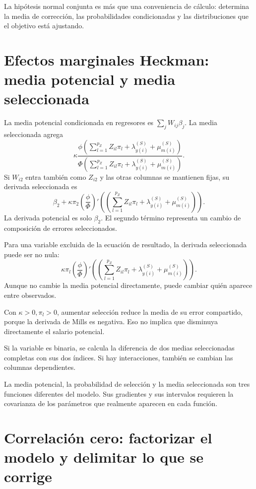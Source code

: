 \documentclass[11pt,a4paper]{article}
\begin{document}
La hipótesis normal conjunta
es más que una conveniencia
de cálculo: determina
la media de corrección,
las probabilidades condicionadas
y las distribuciones que
el objetivo está ajustando.


\clearpage
\section{Efectos marginales Heckman: media potencial y media seleccionada}

La media potencial condicionada
en regresores es
\(\sum_jW_{ij}\beta_j\).
La media seleccionada agrega
\[
\kappa\frac{\phi(\sum_{l=1}^{p_Z}Z_{il}\pi_l+\lambda_{y(i)}^{(S)}+\mu_{m(i)}^{(S)})}
{\Phi(\sum_{l=1}^{p_Z}Z_{il}\pi_l+\lambda_{y(i)}^{(S)}+\mu_{m(i)}^{(S)})}.
\]
Si \(W_{i2}\) entra también
como \(Z_{i2}\) y las
otras columnas se mantienen fijas,
su derivada seleccionada es
\[
\beta_2+\kappa\pi_2
\left(\frac{\phi}{\Phi}\right)'
\left(\left(\sum_{l=1}^{p_Z}Z_{il}\pi_l+\lambda_{y(i)}^{(S)}+\mu_{m(i)}^{(S)}\right)\right).
\]
La derivada potencial es
solo \(\beta_2\).
El segundo término representa
un cambio de composición
de errores seleccionados.

Para una variable excluida
de la ecuación de resultado,
la derivada seleccionada
puede ser no nula:
\[
\kappa\pi_l
\left(\frac{\phi}{\Phi}\right)'
\left(\left(\sum_{l=1}^{p_Z}Z_{il}\pi_l+\lambda_{y(i)}^{(S)}+\mu_{m(i)}^{(S)}\right)\right).
\]
Aunque no cambie la
media potencial directamente,
puede cambiar quién
aparece entre observados.

\begin{ejemplo}[Signos]
Con \(\kappa>0,\pi_l>0\),
aumentar selección reduce
la media de su error
compartido, porque la
derivada de Mills es negativa.
Eso no implica que
disminuya directamente
el salario potencial.
\end{ejemplo}
Si la variable es binaria,
se calcula la diferencia
de dos medias seleccionadas
completas con sus dos índices.
Si hay interacciones,
también se cambian
las columnas dependientes.

La media potencial, la
probabilidad de selección
y la media seleccionada
son tres funciones
diferentes del modelo.
Sus gradientes y
sus intervalos requieren
la covarianza de los
parámetros que realmente
aparecen en cada función.


\clearpage
\section{Correlación cero: factorizar el modelo y delimitar lo que se corrige}
\end{document}
